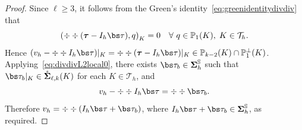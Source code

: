 \begin{proof}
Since $\ell\geq3$,
it follows from the Green's identity~\eqref{eq:greenidentitydivdiv} that
\[
\left(\div\div(\boldsymbol \tau - I_h{\bs\tau}), q \right)_K=0\quad\forall~q\in\mathbb P_1(K), \; K\in\mathcal T_h.
\]
Hence $(v_h-\div\div I_h \bs \tau)|_K=\div\div(\boldsymbol \tau - I_h \bs \tau)|_K\in \mathbb P_{k-2}(K)\cap \mathbb P_1^{\bot}(K)$.
Applying~\eqref{eq:divdivL2local0}, there exists $\bs\tau_b\in\boldsymbol\Sigma_h^{\mathbb S}$ such that $\bs\tau_b|_K \in \mathring{\boldsymbol \Sigma}_{\ell,k}(K)$ for each $K\in\mathcal T_h$, and
\[
v_h-\div\div I_h \bs \tau=\div\div\bs\tau_b.
\]
Therefore $v_h=\div\div(I_h \bs \tau+\bs\tau_b)$, where $I_h \bs \tau+\bs\tau_b\in\boldsymbol\Sigma_h^{\mathbb S}$, as required.
\end{proof}

